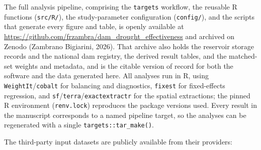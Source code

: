 \documentclass[
]{agujournal2019}
\begin{document}
The full analysis pipeline, comprising the \texttt{targets} workflow,
the reusable R functions (\texttt{src/R/}), the study-parameter
configuration (\texttt{config/}), and the scripts that generate every
figure and table, is openly available at
\url{https://github.com/frzambra/dam_drought_effectiveness} and archived
on Zenodo (Zambrano Bigiarini, 2026). That archive also holds the
reservoir storage records and the national dam registry, the derived
result tables, and the matched-set weights and metadata, and is the
citable version of record for both the software and the data generated
here. All analyses run in R, using \texttt{WeightIt}/\texttt{cobalt} for
balancing and diagnostics, \texttt{fixest} for fixed-effects regression,
and \texttt{sf}/\texttt{terra}/\texttt{exactextractr} for the spatial
extractions; the pinned R environment (\texttt{renv.lock}) reproduces
the package versions used. Every result in the manuscript corresponds to
a named pipeline target, so the analyses can be regenerated with a
single \texttt{targets::tar\_make()}.

The third-party input datasets are publicly available from their
providers:
\end{document}
